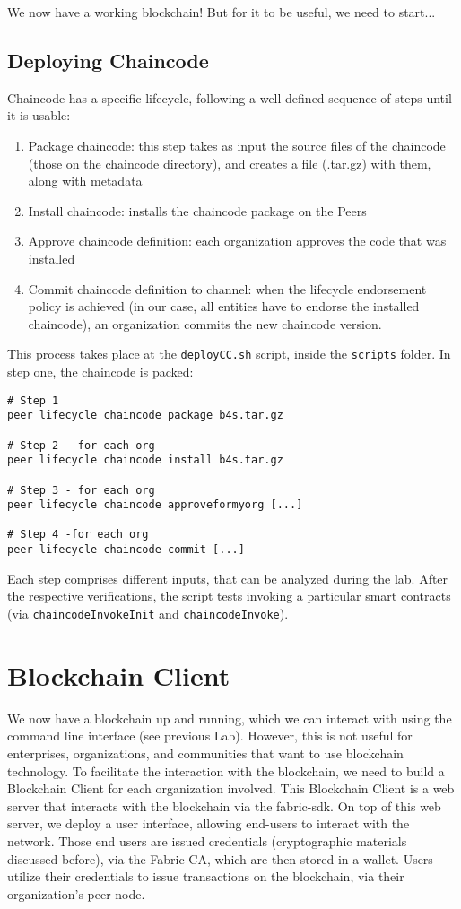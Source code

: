 \documentclass[12pt,a4paper]{article}
\theoremstyle{definition}
\begin{document}
We now have a working blockchain! But for it to be useful, we need to start...

\subsection{Deploying Chaincode}

Chaincode has a specific lifecycle, following a well-defined sequence of steps until it is usable:

\begin{enumerate}
\item Package chaincode: this step takes as input the source files of the chaincode (those on the chaincode directory), and creates a file (.tar.gz) with them, along with metadata
\item Install chaincode: installs the chaincode package on the Peers
\item Approve chaincode definition: each organization approves the code that was installed 
\item Commit chaincode definition to channel: when the lifecycle endorsement policy is achieved (in our case, all entities have to endorse the installed chaincode), an organization commits the new chaincode version.
\end{enumerate}

This process takes place at the \texttt{deployCC.sh} script, inside the \texttt{scripts} folder. In step one, the chaincode is packed:

\begin{verbatim}
# Step 1
peer lifecycle chaincode package b4s.tar.gz

# Step 2 - for each org
peer lifecycle chaincode install b4s.tar.gz

# Step 3 - for each org
peer lifecycle chaincode approveformyorg [...]

# Step 4 -for each org
peer lifecycle chaincode commit [...]
\end{verbatim}

Each step comprises different inputs, that can be analyzed during the lab. After the respective verifications, the script tests invoking a particular smart contracts (via \texttt{chaincodeInvokeInit} and \texttt{chaincodeInvoke}). 

\section{Blockchain Client}
We now have a blockchain up and running, which we can interact with using the command line interface (see previous Lab). However, this is not useful for enterprises, organizations, and communities that want to use blockchain technology. To facilitate the interaction with the blockchain, we need to build a Blockchain Client for each organization involved. This Blockchain Client is a web server that interacts with the blockchain via the fabric-sdk. On top of this web server, we deploy a user interface, allowing end-users to interact with the network. Those end users are issued credentials (cryptographic materials discussed before), via the Fabric CA, which are then stored in a wallet. Users utilize their credentials to issue transactions on the blockchain, via their organization's peer node.
\end{document}
